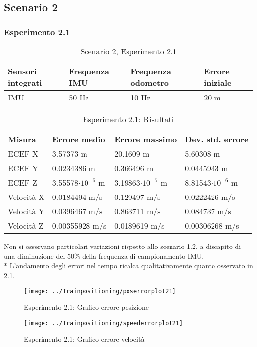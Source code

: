 \subsection{Scenario 2}
\subsubsection{Esperimento 2.1}
\begin{table}[h]
	\centering
	\begin{tabular}{|p{3.2cm}|p{2.75cm}|p{2.75cm}|p{2.75cm}|}
		\hline 
		\textbf{Sensori integrati} & \textbf{Frequenza IMU}  & \textbf{Frequenza odometro} & \textbf{Errore iniziale} \\ 
		\hline 
		IMU & 50 Hz & 10 Hz & 20 m\\ 
		\hline 
	\end{tabular}
	\caption{Scenario 2, Esperimento 2.1}
	\label{tab:exp21}
\end{table}
\begin{table}[h]
	\centering
	\begin{tabular}{|p{2cm}|p{3.2cm}|p{3cm}|p{3cm}|}
		\hline 
		\textbf{Misura} 
		& \textbf{Errore medio} 
		& \textbf{Errore massimo}
		& \textbf{Dev. std. errore}\\ 
		\hline 
		ECEF X & 3.57373 m & 20.1609 m & 5.60308 m \\ 
		\hline 
		ECEF Y & 0.0234386 m & 0.366496 m & 0.0445943 m \\ 
		\hline 
		ECEF Z & 3.55578$\cdot10^{-6}$ m & 3.19863$\cdot10^{-5}$ m & 8.81543$\cdot10^{-6}$ m \\ 
		\hline 
		Velocit\`a X & 0.0184494 m/s & 0.129497 m/s & 0.0222426 m/s \\ 
		\hline 
		Velocit\`a Y & 0.0396467 m/s & 0.863711 m/s & 0.084737 m/s \\ 
		\hline 
		Velocit\`a Z & 0.00355928 m/s & 0.0189619 m/s & 0.00306268 m/s \\ 
		\hline 
	\end{tabular}
	\caption{Esperimento 2.1: Risultati}
	\label{tab:exp21res}
\end{table}\FloatBarrier
Non si osservano particolari variazioni rispetto allo scenario 1.2, a discapito di una diminuzione del 50\% della frequenza di campionamento IMU.\\*
L'andamento degli errori nel tempo ricalca qualitativamente quanto osservato in 2.1. 
\begin{figure}[h]
	\centering
	\texttt{[image: ../Trainpositioning/poserrorplot21]}
	\caption{Esperimento 2.1: Grafico errore posizione}
	\label{fig:poserrorplot21}
\end{figure}
\FloatBarrier
\begin{figure}[h]
	\centering
	\texttt{[image: ../Trainpositioning/speederrorplot21]}
	\caption{Esperimento 2.1: Grafico errore velocit\`a}
	\label{fig:velerrorplot21}
\end{figure}
\newpage
